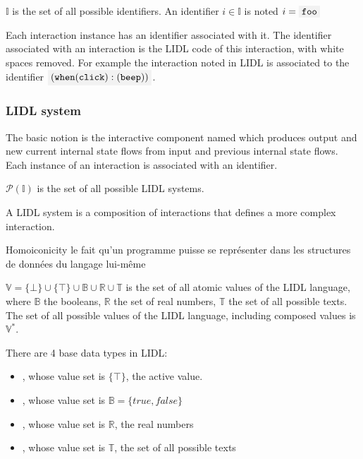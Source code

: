 \begin{definition}[Identifier]
$\mathbb{I}$ is the set of all possible identifiers. An identifier $i \in \mathbb{I}$ is noted $i=\codemath{foo}$
\end{definition}

\noindent
Each interaction instance has an identifier associated with it. The identifier associated with an interaction is the LIDL code of this interaction, with white spaces removed. For example the interaction noted  in LIDL is associated to the identifier
$\codemath{(when(click):(beep))}$.





\subsubsection{LIDL system}



The basic notion is the interactive component named  which produces output and new current internal state flows from input and previous  internal state flows. Each instance of an interaction is associated with an identifier.




\begin{definition}
$\mathcal{P}(\mathbb{I})$ is the set of all possible LIDL systems.
\end{definition}

A LIDL system is a composition of interactions that defines a more complex interaction. 

Homoiconicity
le fait qu’un programme puisse se représenter dans les structures de données du langage lui-même 






\begin{definition}[Value]
$\mathbb{V} = \{\bot\}\cup\{\top\}\cup\mathbb{B}\cup\mathbb{R}\cup\mathbb{T}$ is the set of all atomic values of the LIDL language, where $\mathbb{B}$ the booleans, $\mathbb{R}$ the set of real numbers, $\mathbb{T}$ the set of all possible texts. The set of all possible values of the LIDL language, including composed values is $\mathbb{V}^*$.
\end{definition}

\noindent
There are 4 base data types in LIDL:
\begin{itemize}
	\item {}, whose value set is $\{\top\}$, the active value.
	\item {}, whose value set is $ \mathbb{B} =  \{true, false\}  $
	\item {}, whose value set is $ \mathbb{R} $, the real numbers
 	\item {}, whose value set is $\mathbb{T}$, the set of all possible texts
\end{itemize}

